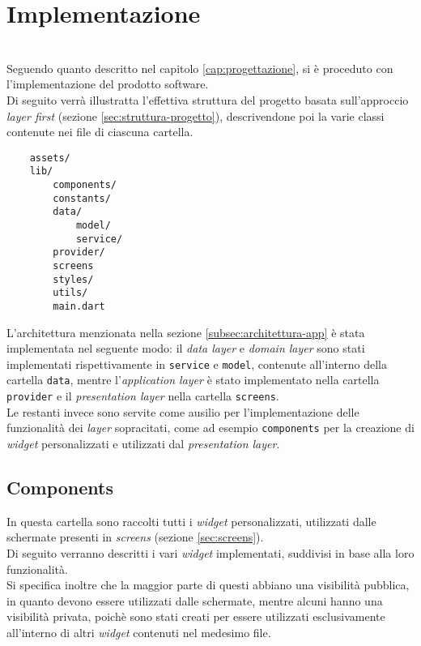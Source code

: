 \chapter{Implementazione}
\label{cap:implementazione}

\\

Seguendo quanto descritto nel capitolo \ref{cap:progettazione}, si è proceduto con l'implementazione del prodotto software.\\
Di seguito verrà illustratta l'effettiva struttura del progetto basata sull'approccio \emph{layer first} (sezione \ref{sec:struttura-progetto}), descrivendone poi la varie classi contenute nei file di ciascuna cartella. \\

\begin{verbatim}
    assets/
    lib/
        components/
        constants/
        data/
            model/
            service/
        provider/
        screens
        styles/
        utils/
        main.dart
\end{verbatim}

L'architettura menzionata nella sezione \ref{subsec:architettura-app} è stata implementata nel seguente modo: il \emph{data layer} e \emph{domain layer} sono stati implementati rispettivamente in \lstinline{service} e \lstinline{model}, contenute all'interno della cartella \lstinline{data}, mentre l'\emph{application layer} è stato implementato nella cartella \lstinline{provider} e il \emph{presentation layer} nella cartella \lstinline{screens}.\\
Le restanti invece sono servite come ausilio per l'implementazione delle funzionalità dei \emph{layer} sopracitati, come ad esempio \lstinline{components} per la creazione di \emph{widget} personalizzati e utilizzati dal \emph{presentation layer}.

\section{Components}
\label{sec:components}

In questa cartella sono raccolti tutti i \emph{widget} personalizzati, utilizzati dalle schermate presenti in \emph{screens} (sezione \ref{sec:screens}).\\
Di seguito verranno descritti i vari \emph{widget} implementati, suddivisi in base alla loro funzionalità.\\
Si specifica inoltre che la maggior parte di questi abbiano una visibilità pubblica, in quanto devono essere utilizzati dalle schermate, mentre alcuni hanno una visibilità privata, poichè sono stati creati per essere utilizzati esclusivamente all'interno di altri \emph{widget} contenuti nel medesimo file.

